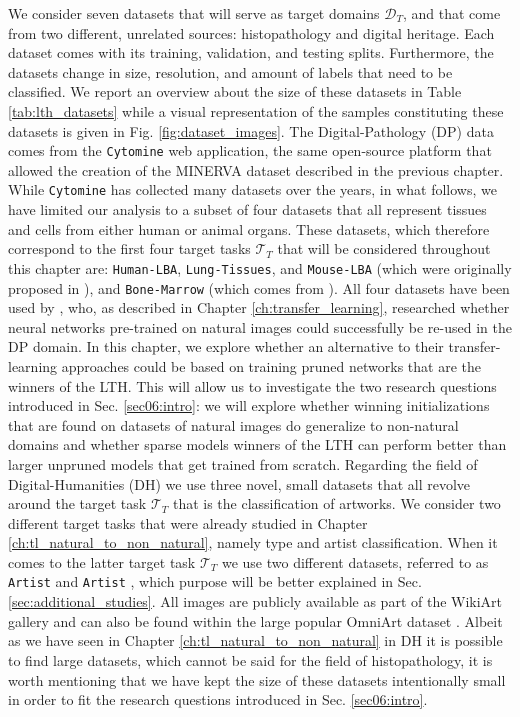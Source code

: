We consider seven datasets that will serve as target domains $\mathcal{D}_T$, and that come from two different, unrelated sources: histopathology and digital heritage. Each dataset comes with its training, validation, and testing splits. Furthermore, the datasets change in size, resolution, and amount of labels that need to be classified. We report an overview about the size of these datasets in Table \ref{tab:lth_datasets} while a visual representation of the samples constituting these datasets is given in Fig. \ref{fig:dataset_images}. The Digital-Pathology (DP) data comes from the \texttt{Cytomine} \cite{maree2016collaborative} web application, the same open-source platform that allowed the creation of the MINERVA dataset described in the previous chapter. While \texttt{Cytomine} has collected many datasets over the years, in what follows, we have limited our analysis to a subset of four datasets that all represent tissues and cells from either human or animal organs. These datasets, which therefore correspond to the first four target tasks $\mathcal{T}_T$ that will be considered throughout this chapter are: \texttt{Human-LBA}, \texttt{Lung-Tissues}, and \texttt{Mouse-LBA} (which were originally proposed in \cite{mormont2018comparison}), and \texttt{Bone-Marrow} (which comes from \cite{kainz2017training}). All four datasets have been used by \citet{mormont2018comparison}, who, as described in Chapter \ref{ch:transfer_learning}, researched whether neural networks pre-trained on natural images could successfully be re-used in the DP domain. In this chapter, we explore whether an alternative to their transfer-learning approaches could be based on training pruned networks that are the winners of the LTH. This will allow us to investigate the two research questions introduced in Sec. \ref{sec06:intro}: we will explore whether winning initializations that are found on datasets of natural images do generalize to non-natural domains and whether sparse models winners of the LTH can perform better than larger unpruned models that get trained from scratch. 
Regarding the field of Digital-Humanities (DH) we use three novel, small datasets that all revolve around the target task $\mathcal{T}_T$ that is the classification of artworks. We consider two different target tasks that were already studied in Chapter \ref{ch:tl_natural_to_non_natural}, namely type and artist classification. When it comes to the latter target task $\mathcal{T}_T$ we use two different datasets, referred to as \texttt{Artist}  and \texttt{Artist} , which purpose will be better explained in Sec. \ref{sec:additional_studies}. All images are publicly available as part of the WikiArt gallery \cite{phillips2011wiki} and can also be found within the large popular OmniArt dataset \cite{strezoski2018omniart}. Albeit as we have seen in Chapter \ref{ch:tl_natural_to_non_natural} in DH it is possible to find large datasets, which cannot be said for the field of histopathology, it is worth mentioning that we have kept the size of these datasets intentionally small in order to fit the research questions introduced in Sec. \ref{sec06:intro}. 

